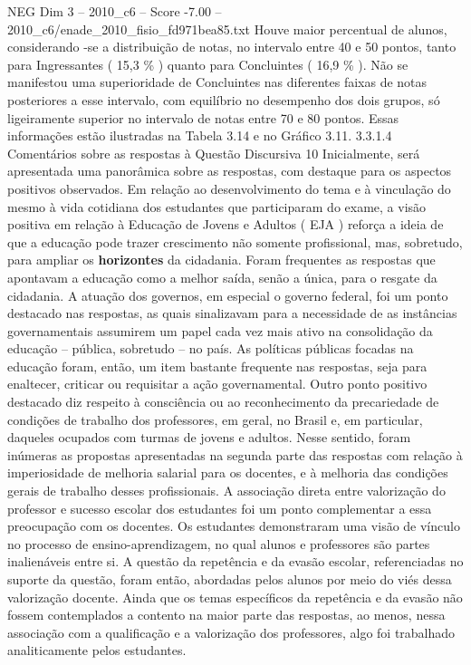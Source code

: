 \begin{textsample}{NEG Dim 3 – 2010\_c6 – Score -7.00 – 2010\_c6/enade\_2010\_fisio\_fd971bea85.txt}
Houve maior percentual de alunos, considerando -se a distribuição de notas, no intervalo entre 40 e 50 pontos, tanto para Ingressantes ( 15,3 \% ) quanto para Concluintes ( 16,9 \% ).
Não se manifestou uma superioridade de Concluintes nas diferentes faixas de notas posteriores a esse intervalo, com equilíbrio no desempenho dos dois grupos, só ligeiramente superior no intervalo de notas entre 70 e 80 pontos.
Essas informações estão ilustradas na Tabela 3.14 e no Gráfico 3.11. 3.3.1.4 Comentários sobre as respostas à Questão Discursiva 10 Inicialmente, será apresentada uma panorâmica sobre as respostas, com destaque para os aspectos positivos observados.
Em relação ao desenvolvimento do tema e à vinculação do mesmo à vida cotidiana dos estudantes que participaram do exame, a visão positiva em relação à Educação de Jovens e Adultos ( EJA ) reforça a ideia de que a educação pode trazer crescimento não somente profissional, mas, sobretudo, para ampliar os \textbf{horizontes} da cidadania.
Foram frequentes as respostas que apontavam a educação como a melhor saída, senão a única, para o resgate da cidadania.
A atuação dos governos, em especial o governo federal, foi um ponto destacado nas respostas, as quais sinalizavam para a necessidade de as instâncias governamentais assumirem um papel cada vez mais ativo na consolidação da educação – pública, sobretudo – no país.
As políticas públicas focadas na educação foram, então, um item bastante frequente nas respostas, seja para enaltecer, criticar ou requisitar a ação governamental.
Outro ponto positivo destacado diz respeito à consciência ou ao reconhecimento da precariedade de condições de trabalho dos professores, em geral, no Brasil e, em particular, daqueles ocupados com turmas de jovens e adultos.
Nesse sentido, foram inúmeras as propostas apresentadas na segunda parte das respostas com relação à imperiosidade de melhoria salarial para os docentes, e à melhoria das condições gerais de trabalho desses profissionais.
A associação direta entre valorização do professor e sucesso escolar dos estudantes foi um ponto complementar a essa preocupação com os docentes.
Os estudantes demonstraram uma visão de vínculo no processo de ensino-aprendizagem, no qual alunos e professores são partes inalienáveis entre si.
A questão da repetência e da evasão escolar, referenciadas no suporte da questão, foram então, abordadas pelos alunos por meio do viés dessa valorização docente.
Ainda que os temas específicos da repetência e da evasão não fossem contemplados a contento na maior parte das respostas, ao menos, nessa associação com a qualificação e a valorização dos professores, algo foi trabalhado analiticamente pelos estudantes.

\end{textsample}
